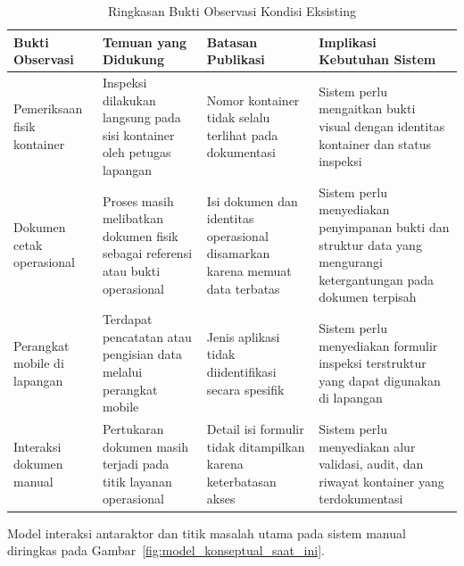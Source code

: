 \begin{table}[ht]
\centering
\scriptsize
\caption{Ringkasan Bukti Observasi Kondisi Eksisting}
\label{tbl:bukti_observasi_eksisting}
\begin{tabularx}{\textwidth}{>{\raggedright\arraybackslash}p{} >{\raggedright\arraybackslash}X >{\raggedright\arraybackslash}X >{\raggedright\arraybackslash}X}
\toprule
\textbf{Bukti Observasi} & \textbf{Temuan yang Didukung} & \textbf{Batasan Publikasi} & \textbf{Implikasi Kebutuhan Sistem} \\
\midrule
Pemeriksaan fisik kontainer & Inspeksi dilakukan langsung pada sisi kontainer oleh petugas lapangan & Nomor kontainer tidak selalu terlihat pada dokumentasi & Sistem perlu mengaitkan bukti visual dengan identitas kontainer dan status inspeksi \\
Dokumen cetak operasional & Proses masih melibatkan dokumen fisik sebagai referensi atau bukti operasional & Isi dokumen dan identitas operasional disamarkan karena memuat data terbatas & Sistem perlu menyediakan penyimpanan bukti dan struktur data yang mengurangi ketergantungan pada dokumen terpisah \\
Perangkat mobile di lapangan & Terdapat pencatatan atau pengisian data melalui perangkat mobile & Jenis aplikasi tidak diidentifikasi secara spesifik & Sistem perlu menyediakan formulir inspeksi terstruktur yang dapat digunakan di lapangan \\
Interaksi dokumen manual & Pertukaran dokumen masih terjadi pada titik layanan operasional & Detail isi formulir tidak ditampilkan karena keterbatasan akses & Sistem perlu menyediakan alur validasi, audit, dan riwayat kontainer yang terdokumentasi \\
\bottomrule
\end{tabularx}
\end{table}

\FloatBarrier

Model interaksi antaraktor dan titik masalah utama pada sistem manual diringkas
pada Gambar~\ref{fig:model_konseptual_saat_ini}.

